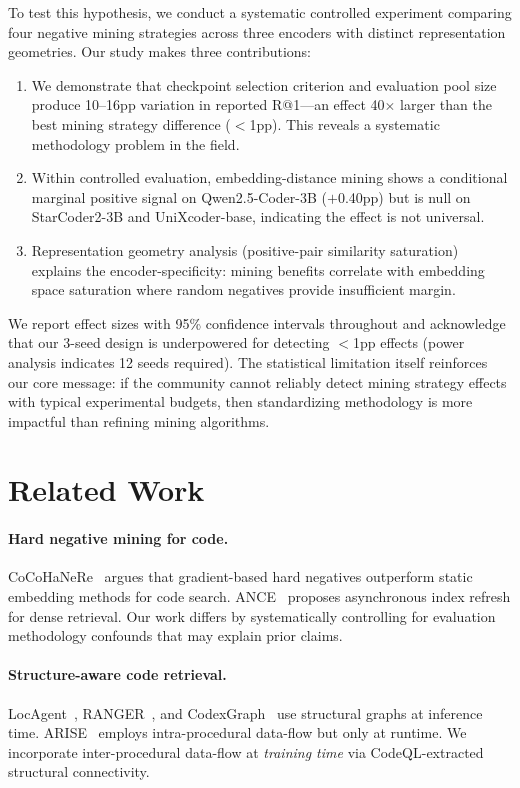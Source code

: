 \documentclass[11pt]{article}
\begin{document}
To test this hypothesis, we conduct a systematic controlled experiment comparing four negative mining strategies across three encoders with distinct representation geometries. Our study makes three contributions:

\begin{enumerate}
    \item We demonstrate that checkpoint selection criterion and evaluation pool size produce 10--16pp variation in reported R@1---an effect 40$\times$ larger than the best mining strategy difference ($<$1pp). This reveals a systematic methodology problem in the field.
    \item Within controlled evaluation, embedding-distance mining shows a conditional marginal positive signal on Qwen2.5-Coder-3B ($+$0.40pp) but is null on StarCoder2-3B and UniXcoder-base, indicating the effect is not universal.
    \item Representation geometry analysis (positive-pair similarity saturation) explains the encoder-specificity: mining benefits correlate with embedding space saturation where random negatives provide insufficient margin.
\end{enumerate}

We report effect sizes with 95\% confidence intervals throughout and acknowledge that our 3-seed design is underpowered for detecting $<$1pp effects (power analysis indicates 12 seeds required). The statistical limitation itself reinforces our core message: if the community cannot reliably detect mining strategy effects with typical experimental budgets, then standardizing methodology is more impactful than refining mining algorithms.

\section{Related Work}

\paragraph{Hard negative mining for code.} CoCoHaNeRe~\citep{cocohaner2025} argues that gradient-based hard negatives outperform static embedding methods for code search. ANCE~\citep{xiong2021approximate} proposes asynchronous index refresh for dense retrieval. Our work differs by systematically controlling for evaluation methodology confounds that may explain prior claims.

\paragraph{Structure-aware code retrieval.} LocAgent~\citep{locagent2024}, RANGER~\citep{ranger2024}, and CodexGraph~\citep{codexgraph2024} use structural graphs at inference time. ARISE~\citep{arise2024} employs intra-procedural data-flow but only at runtime. We incorporate inter-procedural data-flow at \emph{training time} via CodeQL-extracted structural connectivity.
\end{document}
